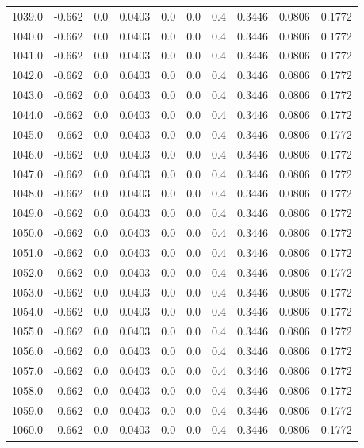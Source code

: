 \begin{longtable}{lrrrrrrrrr}
1039.0 & -0.662 & 0.0 & 0.0403 & 0.0 & 0.0 & 0.4 & 0.3446 & 0.0806 & 0.1772 \\
1040.0 & -0.662 & 0.0 & 0.0403 & 0.0 & 0.0 & 0.4 & 0.3446 & 0.0806 & 0.1772 \\
1041.0 & -0.662 & 0.0 & 0.0403 & 0.0 & 0.0 & 0.4 & 0.3446 & 0.0806 & 0.1772 \\
1042.0 & -0.662 & 0.0 & 0.0403 & 0.0 & 0.0 & 0.4 & 0.3446 & 0.0806 & 0.1772 \\
1043.0 & -0.662 & 0.0 & 0.0403 & 0.0 & 0.0 & 0.4 & 0.3446 & 0.0806 & 0.1772 \\
1044.0 & -0.662 & 0.0 & 0.0403 & 0.0 & 0.0 & 0.4 & 0.3446 & 0.0806 & 0.1772 \\
1045.0 & -0.662 & 0.0 & 0.0403 & 0.0 & 0.0 & 0.4 & 0.3446 & 0.0806 & 0.1772 \\
1046.0 & -0.662 & 0.0 & 0.0403 & 0.0 & 0.0 & 0.4 & 0.3446 & 0.0806 & 0.1772 \\
1047.0 & -0.662 & 0.0 & 0.0403 & 0.0 & 0.0 & 0.4 & 0.3446 & 0.0806 & 0.1772 \\
1048.0 & -0.662 & 0.0 & 0.0403 & 0.0 & 0.0 & 0.4 & 0.3446 & 0.0806 & 0.1772 \\
1049.0 & -0.662 & 0.0 & 0.0403 & 0.0 & 0.0 & 0.4 & 0.3446 & 0.0806 & 0.1772 \\
1050.0 & -0.662 & 0.0 & 0.0403 & 0.0 & 0.0 & 0.4 & 0.3446 & 0.0806 & 0.1772 \\
1051.0 & -0.662 & 0.0 & 0.0403 & 0.0 & 0.0 & 0.4 & 0.3446 & 0.0806 & 0.1772 \\
1052.0 & -0.662 & 0.0 & 0.0403 & 0.0 & 0.0 & 0.4 & 0.3446 & 0.0806 & 0.1772 \\
1053.0 & -0.662 & 0.0 & 0.0403 & 0.0 & 0.0 & 0.4 & 0.3446 & 0.0806 & 0.1772 \\
1054.0 & -0.662 & 0.0 & 0.0403 & 0.0 & 0.0 & 0.4 & 0.3446 & 0.0806 & 0.1772 \\
1055.0 & -0.662 & 0.0 & 0.0403 & 0.0 & 0.0 & 0.4 & 0.3446 & 0.0806 & 0.1772 \\
1056.0 & -0.662 & 0.0 & 0.0403 & 0.0 & 0.0 & 0.4 & 0.3446 & 0.0806 & 0.1772 \\
1057.0 & -0.662 & 0.0 & 0.0403 & 0.0 & 0.0 & 0.4 & 0.3446 & 0.0806 & 0.1772 \\
1058.0 & -0.662 & 0.0 & 0.0403 & 0.0 & 0.0 & 0.4 & 0.3446 & 0.0806 & 0.1772 \\
1059.0 & -0.662 & 0.0 & 0.0403 & 0.0 & 0.0 & 0.4 & 0.3446 & 0.0806 & 0.1772 \\
1060.0 & -0.662 & 0.0 & 0.0403 & 0.0 & 0.0 & 0.4 & 0.3446 & 0.0806 & 0.1772 \\

\end{longtable}
